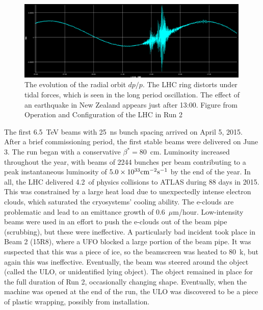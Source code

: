 \begin{figure}[h!]
\captionsetup[subfigure]{position=b}
\centering
\includegraphics[width=0.99\textwidth]{figures/experiment/lhc/tides.png}
\caption{The evolution of the radial orbit $dp/p$. The LHC ring distorts under tidal forces, which is seen in the long period oscillation. The effect of an earthquake in New Zealand appears just after 13:00. Figure from Operation and Configuration of the LHC in Run 2 \cite{lhcRun2}}
\label{fig:tides}
\end{figure}

The first 6.5~TeV beams with 25~ns bunch spacing arrived on April 5, 2015.
After a brief commissioning period, the first stable beams were delivered on June 3.
The run began with a conservative $\beta^*=80$~cm.
Luminosity increased throughout the year, with beams of 2244 bunches per beam contributing to a peak instantaneous luminosity of $5.0\times10^{33}\text{cm}^{-2}\text{s}^{-1}$ by the end of the year.
In all, the LHC delivered 4.2~\fb of physics collisions to ATLAS during 88 days in 2015.
This was constrained by a large heat load due to unexpectedly intense electron clouds, which saturated the cryosystems' cooling ability.
The e-clouds are problematic and lead to an emittance growth of 0.6~$\mu$m/hour.
Low-intensity beams were used in an effort to push the e-clouds out of the beam pipe (scrubbing), but these were ineffective.
A particularly bad incident took place in Beam 2 (15R8), where a UFO blocked a large portion of the beam pipe.
It was suspected that this was a piece of ice, so the beamscreen was heated to 80~k, but again this was ineffective.
Eventually, the beam was steered around the object (called the ULO, or unidentified lying object).
The object remained in place for the full duration of Run 2, occasionally changing shape.
Eventually, when the machine was opened at the end of the run, the ULO was discovered to be a piece of plastic wrapping, possibly from installation.

